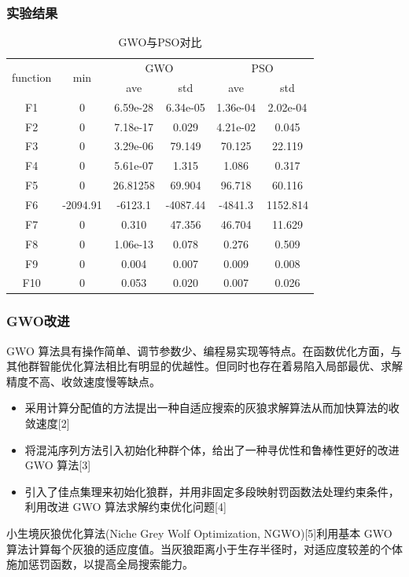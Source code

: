 \begin{frame}
	\frametitle{实验结果}
	\begin{table}[]
	\centering
	\caption{GWO与PSO对比}
	\label{wolf_table3}
	\begin{tabular}{cccccc}
	\multirow{2}{*}{function} & \multirow{2}{*}{min} & \multicolumn{2}{c}{GWO} & \multicolumn{2}{c}{PSO} \\ \cline{3-6} 
	                          &                      & ave        & std        & ave        & std        \\ \hline
	F1                        & 0                    & 6.59e-28   & 6.34e-05   & 1.36e-04   & 2.02e-04   \\
	F2                        & 0                    & 7.18e-17   & 0.029      & 4.21e-02   & 0.045      \\
	F3                        & 0                    & 3.29e-06   & 79.149     & 70.125     & 22.119     \\
	F4                        & 0                    & 5.61e-07   & 1.315      & 1.086      & 0.317      \\
	F5                        & 0                    & 26.81258   & 69.904     & 96.718     & 60.116     \\
	F6                        & -2094.91             & -6123.1    & -4087.44   & -4841.3    & 1152.814   \\
	F7                        & 0                    & 0.310      & 47.356     & 46.704     & 11.629     \\
	F8                        & 0                    & 1.06e-13   & 0.078      & 0.276      & 0.509      \\
	F9                        & 0                    & 0.004      & 0.007      & 0.009      & 0.008      \\
	F10                       & 0                    & 0.053      & 0.020      & 0.007      & 0.026     
	\end{tabular}
	\end{table}
\end{frame}


\begin{frame}
	\frametitle{GWO改进}
	GWO 算法具有操作简单、调节参数少、编程易实现等特点。在函数优化方面，与其他群智能优化算法相比有明显的优越性。但同时也存在着易陷入局部最优、求解精度不高、收敛速度慢等缺点。
	\begin{itemize}
		\item {采用计算分配值的方法提出一种自适应搜索的灰狼求解算法从而加快算法的收敛速度[2]}
		\item {将混沌序列方法引入初始化种群个体，给出了一种寻优性和鲁棒性更好的改进 GWO 算法[3]}
		\item {引入了佳点集理来初始化狼群，并用非固定多段映射罚函数法处理约束条件，利用改进 GWO 算法求解约束优化问题[4]}
	\end{itemize}
	小生境灰狼优化算法(Niche Grey Wolf Optimization, NGWO)[5]利用基本 GWO 算法计算每个灰狼的适应度值。当灰狼距离小于生存半径时，对适应度较差的个体施加惩罚函数，以提高全局搜索能力。
\end{frame}


